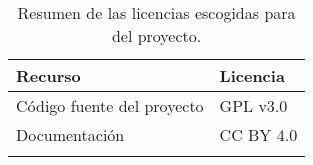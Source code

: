 \begin{longtable}[]{@{}ll@{}}
\toprule 
\begin{minipage}[b]{0.50\columnwidth}\raggedright\strut
Recurso\strut
\end{minipage} & \begin{minipage}[b]{0.21\columnwidth}\raggedright\strut
Licencia\strut
\end{minipage}\tabularnewline
\midrule
\endhead
\begin{minipage}[t]{0.50\columnwidth}\raggedright\strut
Código fuente del proyecto\strut
\end{minipage} & \begin{minipage}[t]{0.21\columnwidth}\raggedright\strut
GPL v3.0\strut
\end{minipage}\tabularnewline
\begin{minipage}[t]{0.50\columnwidth}\raggedright\strut
Documentación\strut
\end{minipage} & \begin{minipage}[t]{0.21\columnwidth}\raggedright\strut
CC BY 4.0\strut
\end{minipage}\tabularnewline
\bottomrule
\caption{Resumen de las licencias escogidas para del proyecto.}
\label{resumelicense}
\end{longtable}